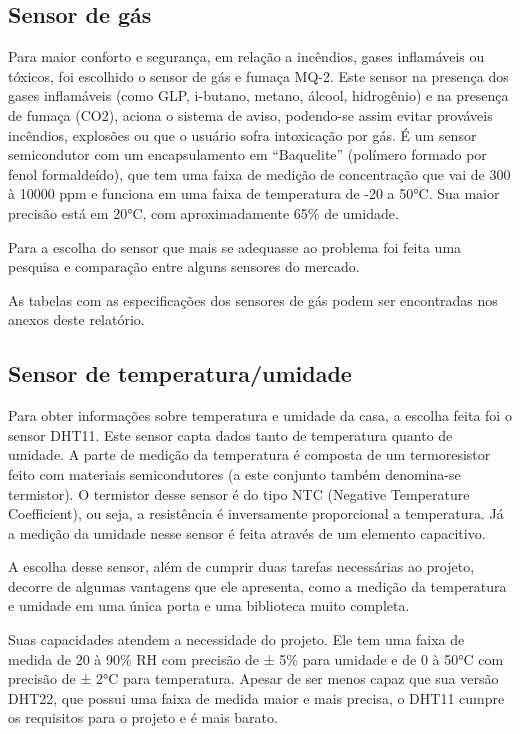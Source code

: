 \subsection{Sensor de gás}
\par Para maior conforto e segurança, em relação a incêndios, gases inflamáveis ou tóxicos, foi escolhido o sensor de gás e fumaça MQ-2. Este sensor na presença dos gases inflamáveis (como GLP, i-butano, metano, álcool, hidrogênio) e na presença de fumaça (CO2), aciona o sistema de aviso, podendo-se assim evitar prováveis incêndios, explosões ou que o usuário sofra intoxicação por gás.  É um sensor semicondutor com um encapsulamento em “Baquelite” (polímero formado por fenol formaldeído), que tem uma faixa de medição de concentração que vai de 300 à 10000 ppm e funciona em uma faixa de temperatura de -20 a 50°C. Sua maior precisão está em 20°C, com aproximadamente 65\% de umidade.
\par Para a escolha do sensor que mais se adequasse ao problema foi feita uma pesquisa e comparação entre alguns sensores do mercado.
\par As tabelas com as especificações dos sensores de gás podem ser encontradas nos anexos deste relatório.

\subsection{Sensor de temperatura/umidade}
\par Para obter informações sobre temperatura e umidade da casa, a escolha feita foi o sensor DHT11. Este sensor capta dados tanto de temperatura quanto de umidade. A parte de medição da temperatura é composta de um termoresistor feito com materiais semicondutores (a este conjunto também denomina-se termistor). O termistor desse sensor é do tipo NTC (Negative Temperature Coefficient), ou seja, a resistência é inversamente proporcional a temperatura. Já a medição da umidade nesse sensor é feita através de um elemento capacitivo.
\par A escolha desse sensor, além de cumprir duas tarefas necessárias ao projeto, decorre de algumas vantagens que ele apresenta, como a medição da temperatura e umidade em uma única porta e uma biblioteca muito completa.
\par Suas capacidades atendem a necessidade do projeto. Ele tem uma faixa de medida de 20 à 90\% RH com precisão de ± 5\% para umidade e de 0 à 50°C com precisão de ± 2°C para temperatura. Apesar de ser menos capaz que sua versão DHT22, que possui uma faixa de medida maior e mais precisa, o DHT11 cumpre os requisitos para o projeto e é mais barato.

